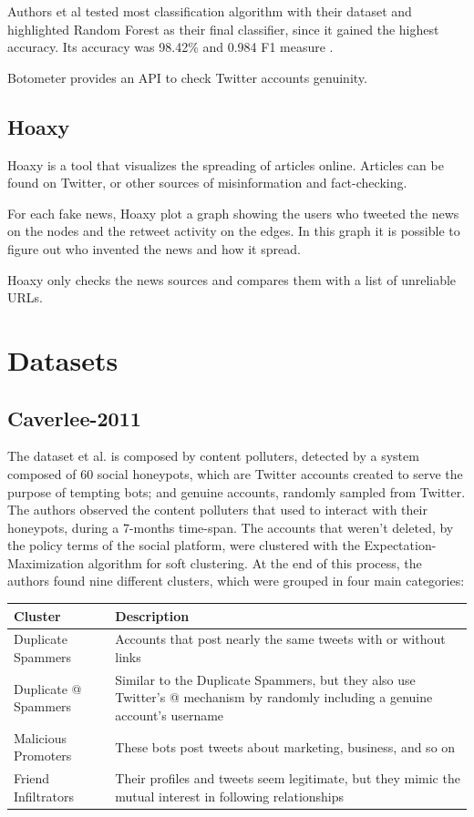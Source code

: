 Authors et al \cite{Botometer} tested most classification algorithm with their dataset and highlighted Random Forest as their final classifier, since it gained the highest accuracy. Its accuracy was 98.42\% and 0.984 F1 measure \cite{Lee11sevenmonths}.

Botometer provides an API to check Twitter accounts genuinity.

\subsection{Hoaxy}
Hoaxy is a tool that visualizes the spreading of articles online. Articles can be found on Twitter, or other sources of misinformation and fact-checking.

For each fake news, Hoaxy plot a graph showing the users who tweeted the news on the nodes and the retweet activity on the edges. In this graph it is possible to figure out who invented the news and how it spread.

Hoaxy only checks the news sources and compares them with a list of unreliable URLs.

\section{Datasets}

\subsection{Caverlee-2011}
The dataset et al. \cite{Lee11sevenmonths} is composed by content polluters, detected by a system composed of 60 social honeypots, which are Twitter accounts created to serve the purpose of tempting bots; and genuine accounts, randomly sampled from Twitter.
The authors observed the content polluters that used to interact with their honeypots, during a 7-months time-span. The accounts that weren't deleted, by the policy terms of the social platform, were clustered with the Expectation-Maximization algorithm for soft clustering. At the end of this process, the authors found nine different clusters, which were grouped in four main categories:

\begin{center}
	\begin{tabular}{>{\raggedright\arraybackslash}m{5.5cm}|>{\raggedright\arraybackslash}m{5.5cm}}
		\\Cluster&Description\\
		\hline\hline
		Duplicate Spammers & Accounts that post nearly the same tweets with or without links\\\hline
		Duplicate @ Spammers & Similar to the Duplicate Spammers, but they also use Twitter’s @ mechanism by randomly including a genuine account’s username\\\hline
		Malicious Promoters & These bots post tweets about marketing, business, and so on\\\hline
		Friend Infiltrators & Their profiles and tweets seem legitimate, but they mimic the mutual interest in following relationships\\\hline
	\end{tabular}
\end{center}

